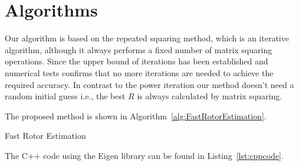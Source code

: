 \documentclass{birkjour}
\numberwithin{equation}{section}
\begin{document}
\section{Algorithms}

Our algorithm is based on the repeated squaring method, which is an iterative algorithm, although it always performs a fixed number of matrix squaring operations. Since the upper bound of iterations has been established and numerical tests confirms that no more iterations are needed to achieve the required accuracy. In contrast to the power iteration our method doesn't need a random initial guess i.e., the best $R$ is always calculated by matrix squaring.

The proposed method is shown in Algorithm~\ref{alg:FastRotorEstimation}. 

\begin{algorithm}
\begin{algorithmic}[1]
\ENDFOR
{}
\ENDFOR
{}
\end{algorithmic}
\caption{Fast Rotor Estimation}\label{alg:FastRotorEstimation}
\end{algorithm}
The C++ code using the Eigen library can be found in Listing~\ref{lst:cppcode}.
\end{document}
